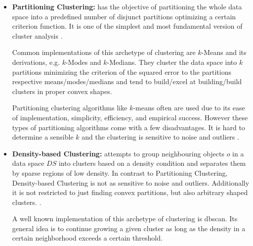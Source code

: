 \begin{itemize}
    \item \textbf{Partitioning Clustering:} has the objective of partitioning the whole data space into a predefined number of disjunct partitions optimizing a certain criterion function. It is one of the simplest and most fundamental version of cluster analysis \cite[Ch.10.2]{han2011data}.
    
    Common implementations of this archetype of clustering are $k$-Means\cite{kmeansmacqueen1967some} and its derivations, e.g. $k$-Modes and $k$-Medians\cite{kmeanshalfcenturysteinley2006k}. They cluster the data space into $k$ partitions minimizing the criterion of the squared error to the partitions respective means/modes/medians and tend to build/excel at building/build clusters in proper convex shapes\cite{clusteringsurveyberkhin2006survey}. 
    
    Partitioning clustering algorithms like $k$-means often are  used due to its ease of implementation, simplicity, efficiency, and empirical success\cite{kmeans50jain2010data}.
    However these types of partitioning algorithms come with a few disadvantages. It is hard to determine a sensible $k$ and the clustering is sensitive to noise and outliers \cite{dataclusteringreviewjain1999data}. 
    
    \item \textbf{Density-based Clustering:} attempts to group neighbouring objects $o$ in a data space $DS$ into clusters based on a density condition and separates them by sparse regions of low density. In contrast to Partitioning Clustering, Density-based Clustering is not as sensitive to noise and outliers. Additionally it is not restricted to just finding convex partitions, but also arbitrary shaped clusters. \cite[Ch.10.4]{han2011data}.
    
    A well known implementation of this archetype of clustering is \acrshort{dbscan}\cite{DBSCANEKSX96}. Its general idea is to continue growing a given cluster as long as the density in a certain neighborhood exceeds a certain threshold. 
    

\end{itemize}
